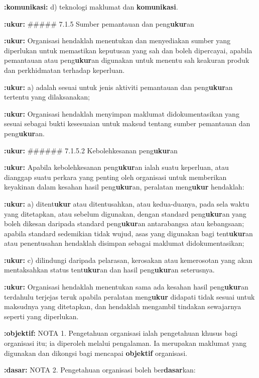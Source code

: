 \documentclass{article}
\begin{document}
\textbf{:komunikasi:} d) teknologi maklumat dan \textbf{komunikasi}.

\textbf{:ukur:} \#\#\#\#\# 7.1.5 Sumber pemantauan dan peng\textbf{ukur}an

\textbf{:ukur:} Organisasi hendaklah menentukan dan menyediakan sumber yang diperlukan untuk
memastikan keputusan yang sah dan boleh dipercayai, apabila pemantauan atau peng\textbf{ukur}an
digunakan untuk menentu sah keakuran produk dan perkhidmatan terhadap keperluan.

\textbf{:ukur:} a) adalah sesuai untuk jenis aktiviti pemantauan dan peng\textbf{ukur}an tertentu yang
dilaksanakan;

\textbf{:ukur:} Organisasi hendaklah menyimpan maklumat didokumentasikan yang sesuai sebagai bukti
kesesuaian untuk maksud tentang sumber pemantauan dan peng\textbf{ukur}an.

\textbf{:ukur:} \#\#\#\#\#\# 7.1.5.2 Kebolehkesanan peng\textbf{ukur}an

\textbf{:ukur:} Apabila kebolehkesanan peng\textbf{ukur}an ialah suatu keperluan, atau dianggap suatu perkara
yang penting oleh organisasi untuk memberikan keyakinan dalam kesahan hasil peng\textbf{ukur}an,
peralatan meng\textbf{ukur} hendaklah:

\textbf{:ukur:} a) ditent\textbf{ukur} atau ditentusahkan, atau kedua-duanya, pada sela waktu yang ditetapkan,
atau sebelum digunakan, dengan standard peng\textbf{ukur}an yang boleh dikesan daripada
standard peng\textbf{ukur}an antarabangsa atau kebangsaan; apabila standard sedemikian tidak
wujud, asas yang digunakan bagi tent\textbf{ukur}an atau penentusahan hendaklah disimpan
sebagai maklumat didokumentasikan;

\textbf{:ukur:} c) dilindungi daripada pelarasan, kerosakan atau kemerosotan yang akan mentaksahkan
status tent\textbf{ukur}an dan hasil peng\textbf{ukur}an seterusnya.

\textbf{:ukur:} Organisasi hendaklah menentukan sama ada kesahan hasil peng\textbf{ukur}an terdahulu terjejas
teruk apabila peralatan meng\textbf{ukur} didapati tidak sesuai untuk maksudnya yang ditetapkan,
dan hendaklah mengambil tindakan sewajarnya seperti yang diperlukan.

\textbf{:objektif:} NOTA 1. Pengetahuan organisasi ialah pengetahuan khusus bagi organisasi itu; ia diperoleh melalui
pengalaman. Ia merupakan maklumat yang digunakan dan dikongsi bagi mencapai \textbf{objektif} organisasi.

\textbf{:dasar:} NOTA 2. Pengetahuan organisasi boleh ber\textbf{dasar}kan:
\end{document}
